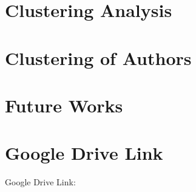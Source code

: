 \documentclass[conference]{IEEEtran}
\begin{document}


\section{Clustering Analysis}




\section{Clustering of Authors}


\section{Future Works}


\section{Google Drive Link}

Google Drive Link: 




\end{document}

